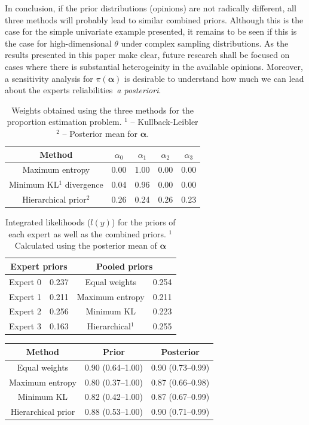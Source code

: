 \documentclass[a4paper, notitlepage, 10pt]{article}
\begin{document}
In conclusion, if the prior distributions (opinions) are not radically different, all three methods will probably lead to similar combined priors.
Although this is the case for the simple univariate example presented, it remains to be seen if this is the case for high-dimensional $\theta$ under complex sampling distributions.
As the results presented in this paper make clear, future research shall be focused on cases where there is substantial heterogeinity in the available opinions.
Moreover, a sensitivity analysis for $\pi(\boldsymbol\alpha)$ is desirable to understand how much we can lead about the experts reliabilities~\textit{a posteriori}.

\begin{table}[ht]
\caption{Weights obtained using the three methods for the proportion estimation problem. $^1$ -- Kullback-Leibler $^2$ -- Posterior mean for $\boldsymbol\alpha$.}
\centering
\begin{tabular}{ccccc}
  \hline
Method  & $\alpha_0$ & $\alpha_1$ & $\alpha_2$ & $\alpha_3$ \\ 
  \hline
Maximum entropy & 0.00 & 1.00 & 0.00 & 0.00 \\ 
Minimum KL$^1$ divergence& 0.04 & 0.96 & 0.00 & 0.00 \\ 
Hierarchical prior$^2$ & 0.26 & 0.24 & 0.26 & 0.23 \\ 
   \hline
\end{tabular}
\label{tab:alphasBeta}
\end{table}

\begin{table}[ht]
\caption{Integrated likelihoods ($l(y)$) for the priors of each expert as well as the combined priors.
$^1$ Calculated using the posterior mean of $\boldsymbol\alpha$}
\centering
\begin{tabular}{cccc}
   \hline
   \multicolumn{2}{c}{Expert priors} &  \multicolumn{2}{c}{Pooled priors} \\
   \hline
   Expert 0 & 0.237 & Equal weights & 0.254\\
   Expert 1 & 0.211 & Maximum entropy & 0.211 \\
   Expert 2 & 0.256 & Minimum KL & 0.223\\ 
   Expert 3 & 0.163 & Hierarchical$^1$ & 0.255 \\
   \hline
\end{tabular}
\label{tab:marglikes}
\end{table}
\begin{table}[ht]
\centering
\begin{tabular}{ccc}
 \hline
Method & Prior & Posterior  \\ 
 \hline
 Equal weights & 0.90 (0.64--1.00) & 0.90 (0.73--0.99) \\ 
 Maximum entropy & 0.80 (0.37--1.00) & 0.87 (0.66--0.98) \\ 
 Minimum KL  & 0.82 (0.42--1.00) & 0.87 (0.67--0.99) \\ 
 Hierarchical prior & 0.88 (0.53--1.00) & 0.90 (0.71--0.99) \\ 
  \hline
\end{tabular}
\label{tab:prior_posteriorsBeta}
\end{table}
\end{document}
